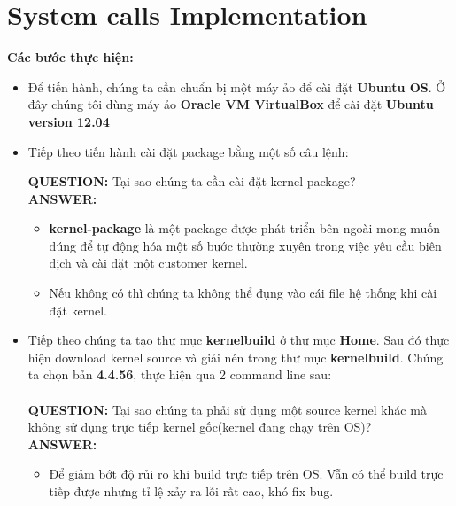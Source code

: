 \documentclass[a4paper]{article}
\begin{document}
\section{System calls Implementation}
\textbf{Các bước thực hiện:}
\begin{itemize}
    \item Để tiến hành, chúng ta cần chuẩn bị một máy ảo để cài đặt \textbf{Ubuntu OS}. Ở đây chúng tôi dùng máy ảo \textbf{Oracle VM VirtualBox} để cài đặt \textbf{Ubuntu version 12.04}
    \item Tiếp theo tiến hành cài đặt package bằng một số câu lệnh:\\

\textbf{QUESTION:} Tại sao chúng ta cần cài đặt kernel-package?\\
\textbf{ANSWER:}
    \begin{itemize}
        \item \textbf{kernel-package} là một package được phát triển bên ngoài mong muốn dúng để tự động hóa một số bước thường xuyên trong việc yêu cầu biên dịch và cài đặt một customer kernel.
        \item Nếu không có thì chúng ta không thể đụng vào cái file hệ thống khi cài đặt kernel.
    \end{itemize}
\item Tiếp theo chúng ta tạo thư mục \textbf{kernelbuild} ở thư mục \textbf{Home}. Sau đó thực hiện download kernel source và giải nén trong thư mục \textbf{kernelbuild}. Chúng ta chọn bản \textbf{4.4.56}, thực hiện qua 2 command line sau:\\
     \\
\textbf{QUESTION:} Tại sao chúng ta phải sử dụng một source kernel khác mà không sử dụng trực tiếp kernel gốc(kernel đang chạy trên OS)?\\
\textbf{ANSWER:}
    \begin{itemize}
        \item Để giảm bớt độ rủi ro khi build trực tiếp trên OS. Vẫn có thể build trực tiếp được nhưng tỉ lệ xảy ra lỗi rất cao, khó fix bug.
    \end{itemize}


\end{itemize}
\end{document}
